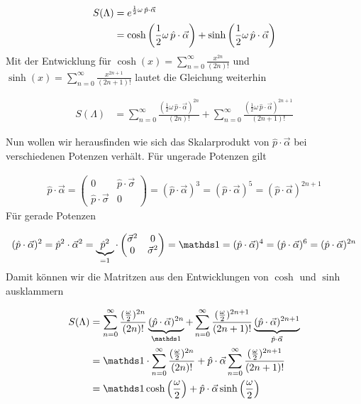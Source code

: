 \begin{align}
  \label{eq:23}
  S(\Lambda) &=e^{\frac{1}{2}\omega\,\hat p\cdot\vec \alpha  } \notag \\
&= \cosh\left(\frac{1}{2}\omega\,\hat p\cdot\vec \alpha\right) + \sinh\left(\frac{1}{2}\omega\,\hat p\cdot\vec \alpha \right)
\end{align}
Mit der Entwicklung für \(\cosh(x) = \sum_{n=0}^{\infty}\frac{x^{2n}}{(2n)!}\) und  \(\sinh(x) = \sum_{n=0}^{\infty}\frac{x^{2n+1}}{(2n+1)!}\) lautet die Gleichung weiterhin

\begin{align}
  \label{eq:24}
  S(\Lambda) &=\sum_{n=0}^{\infty}\frac{\left(\frac{1}{2}\omega\,\hat p\cdot\vec \alpha\right)^{2n}}{(2n)!} + \sum_{n=0}^{\infty}\frac{\left(\frac{1}{2}\omega\,\hat p\cdot\vec \alpha\right)^{2n+1}}{(2n+1)!}
\end{align}

Nun wollen wir herausfinden wie sich das Skalarprodukt von \(\hat p\cdot\vec \alpha\) bei verschiedenen Potenzen verhält. Für ungerade Potenzen gilt

\begin{align}
  \label{eq:25}
  \hat p\cdot\vec \alpha =
  \begin{pmatrix}
    0&\hat p\cdot\vec \sigma\\
    \hat p\cdot\vec \sigma&0
  \end{pmatrix} = (\hat p\cdot\vec \alpha)^3 =(\hat p\cdot\vec \alpha)^5 = (\hat p\cdot\vec \alpha)^{2n+1}
\end{align}
Für gerade Potenzen

\begin{align}
  \label{eq:26}
  (\hat p\cdot\vec \alpha)^2 =\hat p^2\cdot\vec \alpha^2 = \underbr{\hat p^2}_{=1}\cdot
  \begin{pmatrix}
    \vec \sigma^2&0\\
    0&\vec \sigma^2
  \end{pmatrix} = \mathds 1 = (\hat p\cdot\vec \alpha)^4 =(\hat p\cdot\vec \alpha)^6 = (\hat p\cdot\vec \alpha)^{2n}
\end{align}
Damit können wir die Matritzen aus den Entwicklungen von \(\cosh\) und \(\sinh\) ausklammern

\begin{align}
  \label{eq:27}
   S(\Lambda)  &=\sum_{n=0}^{\infty}\frac{(\frac{\omega}{2})^{2n}}{(2n)!}\underbr{(\hat p\cdot\vec \alpha)^{2n}}_{\mathds 1} +
   \sum_{n=0}^{\infty}\frac{(\frac{\omega}{2})^{2n+1}}{(2n+1)!}\underbr{(\hat p\cdot\vec \alpha)^{2n+1}}_{\hat p\cdot\vec\alpha}\notag\\
 &=\mathds 1\cdot \sum_{n=0}^{\infty}\frac{ (\frac{\omega}{2})^{2n}}{(2n)!} +
  \hat p\cdot\vec\alpha \sum_{n=0}^{\infty}\frac{(\frac{\omega}{2})^{2n+1} }{(2n+1)!}\notag\\
&= \mathds 1 \cosh\left(\frac{\omega}{2}\right) + \hat p\cdot\vec \alpha \sinh\left(\frac{\omega}{2} \right)
\end{align}

